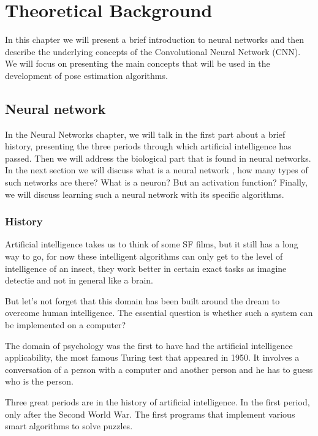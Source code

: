 \chapter{Theoretical Background}

In this chapter we will present a brief introduction to neural networks and then describe the underlying concepts of the Convolutional Neural Network (CNN).
We will focus on presenting the main concepts that will be used in the development of pose estimation algorithms.

\section{Neural network}

In the Neural Networks chapter, we will talk in the first part about a brief history, presenting the three periods through which artificial intelligence has passed.
Then we will address the biological part that is found in neural networks.
In the next section we will discuss what is a neural network , how many types of such networks are there? What is a neuron? But an activation function?
Finally, we will discuss learning such a neural network with its specific algorithms.

\subsection{History}
Artificial intelligence takes us to think of some SF films, 
but it still has a long way to go, for now these intelligent algorithms can
only get to the level of intelligence of an insect, 
they work better in certain exact tasks as imagine detectie  and not in general like a brain.

But let's not forget that this domain has been built around the dream to overcome human intelligence.
The essential question is whether such a system can be implemented on a computer?

The domain of psychology was the first to have had the artificial intelligence applicability, 
the most famous Turing test that appeared in 1950. 
It involves a conversation of a person with a computer and another person and he has to guess who is the person. \cite{historyofneuronalnetwork}

Three great periods are in the history of artificial intelligence. 
In the first period, only after the Second World War. The first programs that implement various smart algorithms to solve puzzles. \cite{historyofneuronalnetwork}

